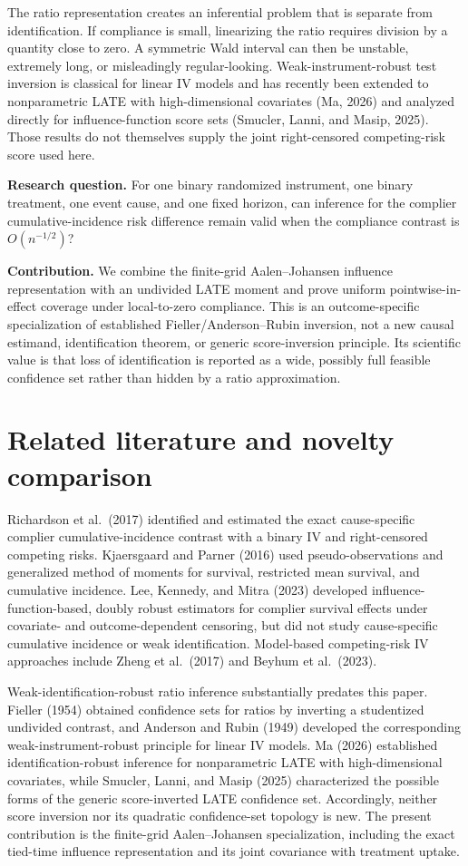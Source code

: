\documentclass[
  10pt,
  letterpaper,
]{article}
\begin{document}
The ratio representation creates an inferential problem that is separate
from identification. If compliance is small, linearizing the ratio
requires division by a quantity close to zero. A symmetric Wald interval
can then be unstable, extremely long, or misleadingly regular-looking.
Weak-instrument-robust test inversion is classical for linear IV models
and has recently been extended to nonparametric LATE with
high-dimensional covariates (Ma, 2026) and analyzed directly for
influence-function score sets (Smucler, Lanni, and Masip, 2025). Those
results do not themselves supply the joint right-censored competing-risk
score used here.

\textbf{Research question.} For one binary randomized instrument, one
binary treatment, one event cause, and one fixed horizon, can inference
for the complier cumulative-incidence risk difference remain valid when
the compliance contrast is $O(n^{-1/2})$?

\textbf{Contribution.} We combine the finite-grid Aalen--Johansen
influence representation with an undivided LATE moment and prove uniform
pointwise-in-effect coverage under local-to-zero compliance. This is an
outcome-specific specialization of established Fieller/Anderson--Rubin
inversion, not a new causal estimand, identification theorem, or generic
score-inversion principle. Its scientific value is that loss of identification is
reported as a wide, possibly full feasible confidence set rather than
hidden by a ratio approximation.

\section{Related literature and novelty comparison}

Richardson et al.~(2017) identified and estimated the exact
cause-specific complier cumulative-incidence contrast with a binary IV
and right-censored competing risks. Kjaersgaard and Parner (2016) used
pseudo-observations and generalized method of moments for survival,
restricted mean survival, and cumulative incidence. Lee, Kennedy, and
Mitra (2023) developed influence-function-based, doubly robust
estimators for complier survival effects under covariate- and
outcome-dependent censoring, but did not study cause-specific cumulative
incidence or weak identification. Model-based competing-risk IV
approaches include Zheng et al.~(2017) and Beyhum et al.~(2023).

Weak-identification-robust ratio inference substantially predates this
paper. Fieller (1954) obtained confidence sets for ratios by inverting a
studentized undivided contrast, and Anderson and Rubin (1949) developed
the corresponding weak-instrument-robust principle for linear IV
models. Ma (2026) established identification-robust inference for
nonparametric LATE with high-dimensional covariates, while Smucler,
Lanni, and Masip (2025) characterized the possible forms of the generic
score-inverted LATE confidence set. Accordingly, neither score inversion
nor its quadratic confidence-set topology is new. The present
contribution is the finite-grid Aalen--Johansen specialization, including
the exact tied-time influence representation and its joint covariance
with treatment uptake.
\end{document}

